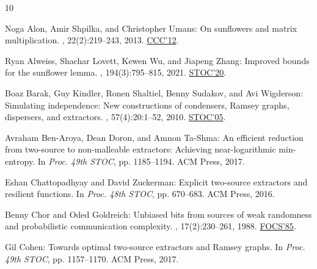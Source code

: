 \documentclass[11pt]{article}
\numberwithin{equation}{section}
\theoremstyle{definition}
\theoremstyle{plain}
\begin{document}
\tocrefpdfbookmark
\begin{thebibliography}{10}

{\sc Noga Alon, Amir Shpilka, and Christopher Umans}: On sunflowers and matrix
  multiplication.
, 22(2):219--243, 2013.
\newblock \prelim \href{https://doi.org/10.1109/CCC.2012.26}{CCC'12}.

{\sc Ryan Alweiss, Shachar Lovett, Kewen Wu, and Jiapeng Zhang}: Improved
  bounds for the sunflower lemma.
, 194(3):795--815, 2021.
\newblock \prelim \href{https://doi.org/10.1145/3357713.3384234}{STOC'20}.

{\sc Boaz Barak, Guy Kindler, Ronen Shaltiel, Benny Sudakov, and Avi
  Wigderson}: Simulating independence: New constructions of condensers,
  {R}amsey graphs, dispersers, and extractors.
, 57(4):20:1--52, 2010.
\newblock \prelim \href{https://doi.org/10.1145/1060590.1060592}{STOC'05}.

{\sc Avraham Ben-Aroya, Dean Doron, and Amnon Ta-Shma}: An efficient reduction
  from two-source to non-malleable extractors: {A}chieving near-logarithmic
  min-entropy.
\newblock In {\em Proc. 49th STOC}, pp. 1185--1194. ACM Press, 2017.

{\sc Eshan Chattopadhyay and David Zuckerman}: Explicit two-source extractors
  and resilient functions.
\newblock In {\em Proc. 48th STOC}, pp. 670--683. ACM Press, 2016.

{\sc Benny Chor and Oded Goldreich}: Unbiased bits from sources of weak
  randomness and probabilistic communication complexity.
, 17(2):230--261, 1988.
\newblock \prelim \href{https://doi.org/10.1109/SFCS.1985.62}{FOCS'85}.
\newblock [\epfmtdoi{10.1137/0217015}]

{\sc Gil Cohen}: Towards optimal two-source extractors and {R}amsey graphs.
\newblock In {\em Proc. 49th STOC}, pp. 1157--1170. ACM Press, 2017.


\end{thebibliography}
\end{document}
